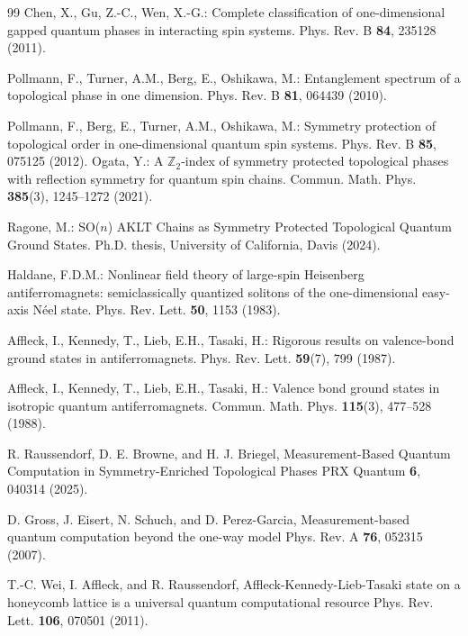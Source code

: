 \documentclass[11pt,a4paper]{article}
\begin{document}
\begin{thebibliography}{99}
Chen, X., Gu, Z.-C., Wen, X.-G.:
Complete classification of one-dimensional gapped quantum phases in interacting spin systems.
Phys. Rev. B \textbf{84}, 235128 (2011).
 
Pollmann, F., Turner, A.M., Berg, E., Oshikawa, M.:
Entanglement spectrum of a topological phase in one dimension.
Phys. Rev. B \textbf{81}, 064439 (2010).

Pollmann, F., Berg, E., Turner, A.M., Oshikawa, M.:
Symmetry protection of topological order in one-dimensional quantum spin systems.
Phys. Rev. B \textbf{85}, 075125 (2012).
Ogata, Y.:
A $\mathbb{Z}_2$-index of symmetry protected topological phases with reflection symmetry for quantum spin chains.
Commun. Math. Phys. \textbf{385}(3), 1245--1272 (2021).


 


Ragone, M.: SO($n$) AKLT Chains as Symmetry Protected Topological Quantum Ground States.
Ph.D. thesis, University of California, Davis (2024).


Haldane, F.D.M.: Nonlinear field theory of large-spin Heisenberg antiferromagnets: semiclassically quantized solitons of the one-dimensional easy-axis N\'eel state.
Phys. Rev. Lett. \textbf{50}, 1153 (1983).

Affleck, I., Kennedy, T., Lieb, E.H., Tasaki, H.:
Rigorous results on valence-bond ground states in antiferromagnets.
Phys. Rev. Lett. \textbf{59}(7), 799 (1987).

Affleck, I., Kennedy, T., Lieb, E.H., Tasaki, H.:
Valence bond ground states in isotropic quantum antiferromagnets.
Commun. Math. Phys. \textbf{115}(3), 477--528 (1988).

 
R. Raussendorf, D. E. Browne, and H. J. Briegel,
Measurement-Based Quantum Computation in Symmetry-Enriched Topological Phases
PRX Quantum \textbf{6}, 040314 (2025).

D. Gross, J. Eisert, N. Schuch, and D. Perez-Garcia,
Measurement-based quantum computation beyond the one-way model
Phys. Rev. A \textbf{76}, 052315 (2007).

T.-C. Wei, I. Affleck, and R. Raussendorf,
Affleck-Kennedy-Lieb-Tasaki state on a honeycomb lattice is a universal quantum computational resource
Phys. Rev. Lett. \textbf{106}, 070501 (2011).


\end{thebibliography}
\end{document}
